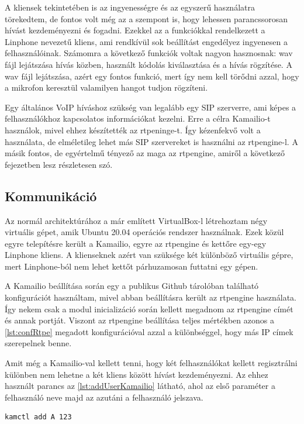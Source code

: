 A kliensek tekintetében is az ingyenességre és az egyszerű használatra törekedtem, 
de fontos volt még az a szempont is, hogy lehessen parancssorosan hívást kezdeményezni
és fogadni. Ezekkel az a funkciókkal rendelkezett a Linphone nevezetű kliens, ami
rendkívül sok beállítást engedélyez ingyenesen a felhasználóinak. Számomra a következő
funkciók voltak nagyon hasznosnak: wav fájl lejátszása hívás közben, használt kódolás
kiválasztása és a hívás rögzítése. A wav fájl lejátszása, azért egy fontos funkció, mert
így nem kell törődni azzal, hogy a mikrofon keresztül valamilyen hangot tudjon rögzíteni.

Egy általános VoIP híváshoz szükség van legalább egy SIP szerverre, ami képes a felhasználókhoz
kapcsolatos információkat kezelni. Erre a célra Kamailio-t használok, mivel ehhez készítették
az rtpeninge-t. Így kézenfekvő volt a használata, de elméletileg lehet más SIP szervereket
is használni az rtpengine-l. A másik fontos, de egyértelmű tényező az maga az rtpengine, 
amiről a következő fejezetben lesz részletesen szó. 

\subsection{Kommunikáció}

Az normál architektúrához a már említett VirtualBox-l létrehoztam négy virtuális gépet,
amik Ubuntu 20.04 operációs rendszer használnak. Ezek közül egyre telepítésre került 
a Kamailio, egyre az rtpengine és kettőre egy-egy Linphone kliens. A klienseknek azért
van szüksége két különböző virtuális gépre, mert Linphone-ból nem lehet kettőt
párhuzamosan futtatni egy gépen.

A Kamailio beállítása során egy a publikus Github tárolóban található konfigurációt
használtam, mivel abban beállításra került az rtpengine használata. Így nekem 
csak a modul inicializáció során kellett megadnom az rtpengine címét és annak portját. 
Viszont az rtpengine beállítása teljes mértékben azonos a \ref{lst:confRtpe} megadott konfigurációval azzal a különbséggel, hogy más IP címek szerepelnek benne.

Amit még a Kamailio-val kellett tenni, hogy két felhasználókat kellett regisztrálni
különben nem lehetne a két kliens között hívást kezdeményezni. Az ehhez használt parancs
az \ref{lst:addUserKamailio} látható, ahol az első paraméter a felhasználó neve majd az azutáni a felhasználó jelszava.

\begin{lstlisting}[caption=Felhasználó hozzáadása Kamailio-hoz, label=lst:addUserKamailio]
kamctl add A 123
\end{lstlisting}

